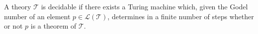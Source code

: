 A theory $\mathcal{T}$ is decidable if there exists a Turing machine which, given the Godel number of an element $p \in \mathcal{L}(\mathcal{T})$, determines in a finite number of steps whether or not $p$ is a theorem of $\mathcal{T}$.

